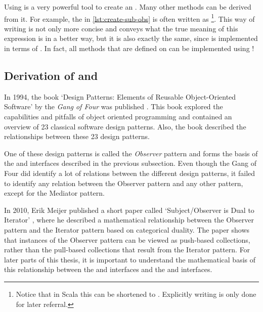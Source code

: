 Using  is a very powerful tool to create an \obs. Many other methods can be derived from it. For example, the \obs in \autoref{lst:create-sub-obs} is often written as \footnote{Notice that in Scala this can be shortened to . Explicitly writing  is only done for later referral.}. This way of writing is not only more concise and conveys what the true meaning of this expression is in a better way, but it is also exactly the same, since  is implemented in terms of . In fact, all methods that are defined on \obs can be implemented using !

\subsection{Derivation of \obs and \obv}
In 1994, the book `Design Patterns: Elements of Reusable Object-Oriented Software' by the \textit{Gang of Four} was published . This book explored the capabilities and pitfalls of object oriented programming and contained an overview of 23 classical software design patterns. Also, the book described the relationships between these 23 design patterns.

One of these design patterns is called the \textit{Observer} pattern and forms the basis of the \obs and \obv interfaces described in the previous subsection. Even though the Gang of Four did identify a lot of relations between the different design patterns, it failed to identify any relation between the Observer pattern and any other pattern, except for the Mediator pattern. 

In 2010, Erik Meijer published a short paper called `Subject/Observer is Dual to Iterator' , where he described a mathematical relationship between the Observer pattern and the Iterator pattern based on categorical duality. The paper shows that instances of the Observer pattern can be viewed as push-based collections, rather than the pull-based collections that result from the Iterator pattern. For later parts of this thesis, it is important to understand the mathematical basis of this relationship between the \obs and \obv interfaces and the \itb and \itr interfaces.

